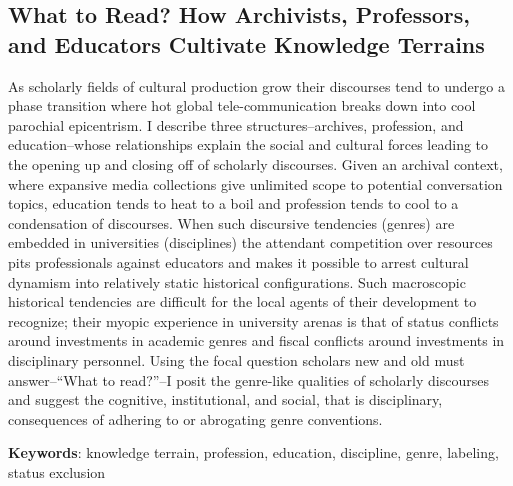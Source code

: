 \documentclass[]{book}
\theoremstyle{definition}
\theoremstyle{definition}
\theoremstyle{definition}
\theoremstyle{remark}
\begin{document}
\hypertarget{what-to-read-how-archivists-professors-and-educators-cultivate-knowledge-terrains}{%
\subsection*{What to Read? How Archivists, Professors, and Educators
Cultivate Knowledge
Terrains}\label{what-to-read-how-archivists-professors-and-educators-cultivate-knowledge-terrains}}























As scholarly fields of cultural production grow their
discourses tend to undergo a phase transition where hot global
tele-communication breaks down into cool parochial epicentrism. I
describe three structures--archives, profession, and education--whose
relationships explain the social and cultural forces leading to the
opening up and closing off of scholarly discourses. Given an archival
context, where expansive media collections give unlimited scope to
potential conversation topics, education tends to heat to a boil and
profession tends to cool to a condensation of discourses. When such
discursive tendencies (genres) are embedded in universities
(disciplines) the attendant competition over resources pits
professionals against educators and makes it possible to arrest cultural
dynamism into relatively static historical configurations. Such
macroscopic historical tendencies are difficult for the local agents of
their development to recognize; their myopic experience in university
arenas is that of status conflicts around investments in academic genres
and fiscal conflicts around investments in disciplinary personnel. Using
the focal question scholars new and old must answer--``What to
read?''--I posit the genre-like qualities of scholarly discourses and
suggest the cognitive, institutional, and social, that is disciplinary,
consequences of adhering to or abrogating genre conventions.




\textbf{Keywords}: knowledge terrain, profession, education, discipline,
genre, labeling, status exclusion
\end{document}
